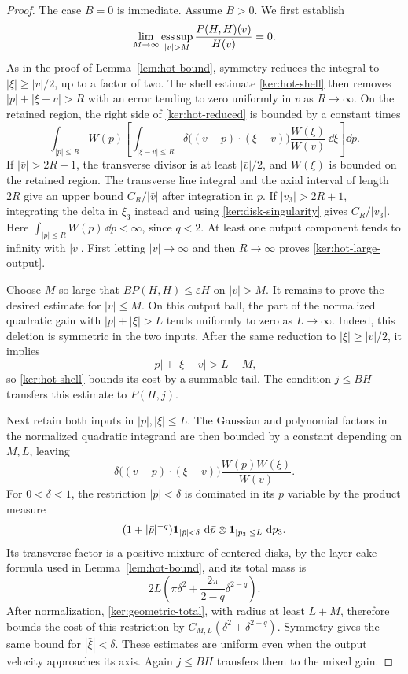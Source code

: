 \begin{proof}
The case $B=0$ is immediate. Assume $B>0$. We first establish
\begin{equation}\label{ker:hot-large-output}
 \lim_{M\to\infty}\esssup_{|v|>M}
                  \frac{P(H,H)(v)}{H(v)}=0.
\end{equation}
As in the proof of Lemma~\ref{lem:hot-bound}, symmetry reduces the
integral to $|\xi|\geq|v|/2$, up to a factor of two.
The shell estimate \eqref{ker:hot-shell} then removes
$|p|+|\xi-v|>R$ with an error tending to zero uniformly in $v$ as
$R\to\infty$. On the retained region, the right side of
\eqref{ker:hot-reduced} is bounded by a constant times
\[
 \int_{|p|\leq R}W(p)
 \left[\int_{|\xi-v|\leq R}
   \delta\bigl((v-p)\cdot(\xi-v)\bigr)
               \frac{W(\xi)}{W(v)}\,\dd\xi\right]\dd p.
\]
If $|\bar v|>2R+1$, the transverse divisor is at least
$|\bar v|/2$, and $W(\xi)$ is bounded on the retained region. The
transverse line integral and the axial interval of length $2R$ give
an upper bound $C_R/|\bar v|$ after integration in $p$. If
$|v_3|>2R+1$, integrating the delta in $\xi_3$ instead and using
\eqref{ker:disk-singularity} gives $C_R/|v_3|$. Here
$\int_{|p|\leq R}W(p)\,\dd p<\infty$, since $q<2$.
At least one output component tends to infinity with $|v|$.
First letting $|v|\to\infty$ and then $R\to\infty$ proves
\eqref{ker:hot-large-output}.

Choose $M$ so large that $BP(H,H)\leq\varepsilon H$ on $|v|>M$.
It remains to prove the desired estimate for $|v|\leq M$. On this
output ball, the part of the normalized quadratic gain with
$|p|+|\xi|>L$ tends uniformly to zero as $L\to\infty$. Indeed, this
deletion is symmetric in the two inputs. After the same reduction to
$|\xi|\geq|v|/2$, it implies
\[
 |p|+|\xi-v|>L-M,
\]
so \eqref{ker:hot-shell} bounds its cost by a summable tail.
The condition $j\leq BH$ transfers this estimate to $P(H,j)$.

Next retain both inputs in $|p|,|\xi|\leq L$. The Gaussian and
polynomial factors in the normalized quadratic integrand are then
bounded by a constant depending on $M,L$, leaving
\[
 \delta\bigl((v-p)\cdot(\xi-v)\bigr)
                       \frac{W(p)W(\xi)}{W(v)}.
\]
For $0<\delta<1$, the restriction $|\bar p|<\delta$ is dominated in
its $p$ variable by the product measure
\[
 (1+|\bar p|^{-q})\mathbf 1_{|\bar p|<\delta}\,\,\mathrm d\bar p
       \otimes\mathbf 1_{|p_3|\leq L}\,\,\mathrm d p_3.
\]
Its transverse factor is a positive mixture of centered disks, by
the layer-cake formula used in Lemma~\ref{lem:hot-bound}, and its
total mass is
\[
 2L\left(\pi\delta^2+
                  \frac{2\pi}{2-q}\delta^{2-q}\right).
\]
After normalization, \eqref{ker:geometric-total}, with radius at
least $L+M$, therefore bounds the cost of this restriction by
$C_{M,L}(\delta^2+\delta^{2-q})$. Symmetry gives the same bound
for $|\bar\xi|<\delta$. These estimates are uniform even when the
output velocity approaches its axis. Again $j\leq BH$ transfers
them to the mixed gain.


\end{proof}
